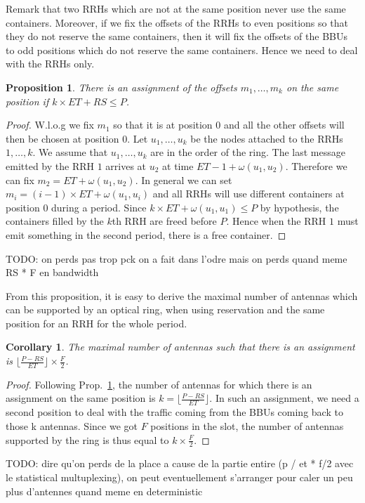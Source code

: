\documentclass[10pt, conference, letterpaper]{IEEEtran}
\newcommand{\todo}[1]{{\color{red} TODO: {#1}}}
\newtheorem{prop}{Proposition}
\newtheorem{corollary}{Corollary}
\begin{document}
Remark that two RRHs which are not at the same position never use the same containers. Moreover, if we fix the offsets of the RRHs to even positions so that they do not reserve the same containers, then it will fix the offsets of the BBUs to odd positions which do not reserve the same containers. Hence we need to deal with the RRHs only.


\begin{prop}
\label{prop:assign}
There is an assignment of the offsets $m_1, \dots, m_k$ on the same position if  $k\times ET + RS \leq P$.
\end{prop}
\begin{proof}
 W.l.o.g we fix $m_1$ so that it is at position $0$ and all the other offsets will then be chosen at position $0$. 
 Let $u_1,\dots,u_k$ be the nodes attached to the RRHs $1,\dots,k$. We assume that $u_1,\dots,u_k$ are in the order of the ring. The last message emitted by the RRH $1$ arrives at $u_2$ at time $ET - 1 + \omega(u_1,u_2)$. Therefore we can fix $m_2 =  ET  + \omega(u_1,u_2)$. In general we can set $m_i = (i-1) \times ET + \omega(u_1,u_i)$ and all RRHs will use different containers at position $0$ during a period. Since $k \times ET + \omega(u_1,u_1) \leq P$ by hypothesis,
 the containers filled by the $k$th RRH are freed before $P$. Hence when the RRH $1$ must emit something in the second period, there is a free container.
\end{proof}
\todo{on perds pas trop pck on a fait dans l'odre mais on perds quand meme RS * F en bandwidth}

From this proposition, it is easy to derive the maximal number of antennas which can be supported by an optical ring,
when using reservation and the same position for an RRH for the whole period.

\begin{corollary}
The maximal number of antennas such that there is an assignment is $ \lfloor\frac{P- RS}{ET}\rfloor \times \frac{F}{2}$.
\end{corollary}
\begin{proof}
Following Prop.~\ref{prop:assign}, the number of antennas for which there is an assignment on the same position is $k = \lfloor\frac{P- RS}{ET}\rfloor $.
In such an assignment, we need a second position to deal with the traffic coming from the BBUs coming back to those k antennas. Since we got  $F$ positions in the slot, the number of antennas supported by the ring is thus equal to $k \times \frac{F}{2}$.
\end{proof}
\todo{dire qu'on perds de la place a cause de la partie entire (p / et * f/2 avec le statistical multuplexing), on peut eventuellement s'arranger pour caler un peu plus d'antennes quand meme en deterministic}
\end{document}
